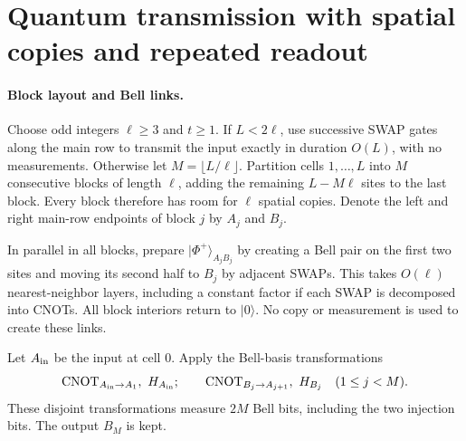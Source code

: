 \documentclass[aps,prl,twocolumn,superscriptaddress,longbibliography,reprint,floatfix]{revtex4-2}
\begin{document}
\FloatBarrier
\section{Quantum transmission with spatial copies and repeated readout}
\label{sm:wire-upper}

\paragraph*{Block layout and Bell links.}
Choose odd integers $\ell\geq3$ and $t\geq1$. If $L<2\ell$, use
successive SWAP gates along the main row to transmit the input exactly
in duration $O(L)$, with no measurements. Otherwise let
$M=\lfloor L/\ell\rfloor$. Partition cells $1,\ldots,L$ into $M$
consecutive blocks of length $\ell$, adding the remaining
$L-M\ell$ sites to the last block. Every block therefore has room
for $\ell$ spatial copies. Denote the left and right main-row endpoints
of block $j$ by $A_j$ and $B_j$.

In parallel in all blocks, prepare
$\lvert\Phi^+\rangle_{A_jB_j}$ by creating a Bell pair on the first
two sites and moving its second half to $B_j$ by adjacent SWAPs.
This takes $O(\ell)$ nearest-neighbor layers, including a constant
factor if each SWAP is decomposed into CNOTs. All block interiors
return to $\lvert0\rangle$. No copy or measurement is used to create
these links.

Let $A_{\rm in}$ be the input at cell $0$. Apply the Bell-basis transformations
\begin{equation}
 \mathrm{CNOT}_{A_{\rm in}\to A_1},\ H_{A_{\rm in}};
 \qquad
 \mathrm{CNOT}_{B_j\to A_{j+1}},\ H_{B_j}
 \quad(1\leq j<M).
 \label{eq:wire-bell-transform}
\end{equation}
These disjoint transformations measure $2M$ Bell bits, including the
two injection bits. The output $B_M$ is kept.
\end{document}
